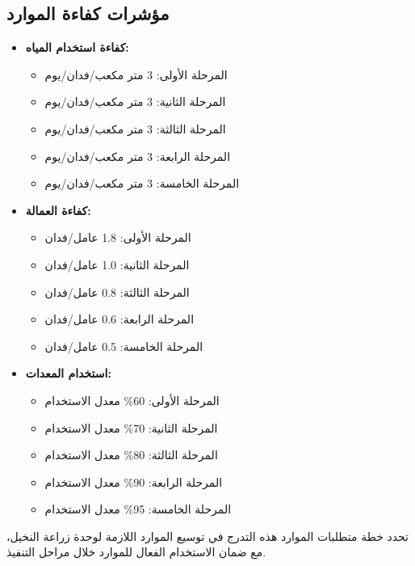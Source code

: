 \subsection{مؤشرات كفاءة الموارد}
\begin{itemize}
    \item \textbf{كفاءة استخدام المياه:}
    \begin{itemize}
        \item المرحلة الأولى: 3 متر مكعب/فدان/يوم
        \item المرحلة الثانية: 3 متر مكعب/فدان/يوم
        \item المرحلة الثالثة: 3 متر مكعب/فدان/يوم
        \item المرحلة الرابعة: 3 متر مكعب/فدان/يوم
        \item المرحلة الخامسة: 3 متر مكعب/فدان/يوم
    \end{itemize}
    \item \textbf{كفاءة العمالة:}
    \begin{itemize}
        \item المرحلة الأولى: 1.8 عامل/فدان
        \item المرحلة الثانية: 1.0 عامل/فدان
        \item المرحلة الثالثة: 0.8 عامل/فدان
        \item المرحلة الرابعة: 0.6 عامل/فدان
        \item المرحلة الخامسة: 0.5 عامل/فدان
    \end{itemize}
    \item \textbf{استخدام المعدات:}
    \begin{itemize}
        \item المرحلة الأولى: 60\% معدل الاستخدام
        \item المرحلة الثانية: 70\% معدل الاستخدام
        \item المرحلة الثالثة: 80\% معدل الاستخدام
        \item المرحلة الرابعة: 90\% معدل الاستخدام
        \item المرحلة الخامسة: 95\% معدل الاستخدام
    \end{itemize}
\end{itemize}

تحدد خطة متطلبات الموارد هذه التدرج في توسيع الموارد اللازمة لوحدة زراعة النخيل، مع ضمان الاستخدام الفعال للموارد خلال مراحل التنفيذ.
